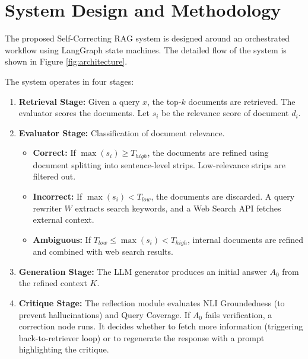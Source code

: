 \documentclass[12pt,a4paper]{article}
\begin{document}
\newpage

\section{System Design and Methodology}
The proposed Self-Correcting RAG system is designed around an orchestrated workflow using LangGraph state machines. The detailed flow of the system is shown in Figure \ref{fig:architecture}.

The system operates in four stages:
\begin{enumerate}
    \item \textbf{Retrieval Stage:} Given a query $x$, the top-$k$ documents are retrieved. The evaluator scores the documents. Let $s_i$ be the relevance score of document $d_i$.
    \item \textbf{Evaluator Stage:} Classification of document relevance.
    \begin{itemize}
        \item \textbf{Correct:} If $\max(s_i) \geq T_{high}$, the documents are refined using document splitting into sentence-level strips. Low-relevance strips are filtered out.
        \item \textbf{Incorrect:} If $\max(s_i) < T_{low}$, the documents are discarded. A query rewriter $W$ extracts search keywords, and a Web Search API fetches external context.
        \item \textbf{Ambiguous:} If $T_{low} \leq \max(s_i) < T_{high}$, internal documents are refined and combined with web search results.
    \end{itemize}
    \item \textbf{Generation Stage:} The LLM generator produces an initial answer $A_0$ from the refined context $K$.
    \item \textbf{Critique Stage:} The reflection module evaluates NLI Groundedness (to prevent hallucinations) and Query Coverage. If $A_0$ fails verification, a correction node runs. It decides whether to fetch more information (triggering back-to-retriever loop) or to regenerate the response with a prompt highlighting the critique.
\end{enumerate}
\end{document}
